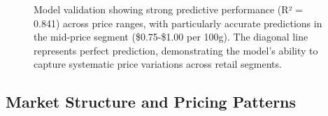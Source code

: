 \documentclass[
  letterpaper,
  DIV=11,
  numbers=noendperiod]{scrartcl}
\begin{document}
\begin{figure}[H]


\caption{\label{fig-predictions}Model validation showing strong
predictive performance (R² = 0.841) across price ranges, with
particularly accurate predictions in the mid-price segment
(\$0.75-\$1.00 per 100g). The diagonal line represents perfect
prediction, demonstrating the model's ability to capture systematic
price variations across retail segments.}

\end{figure}%

\subsection{Market Structure and Pricing
Patterns}\label{market-structure-and-pricing-patterns}
\end{document}
